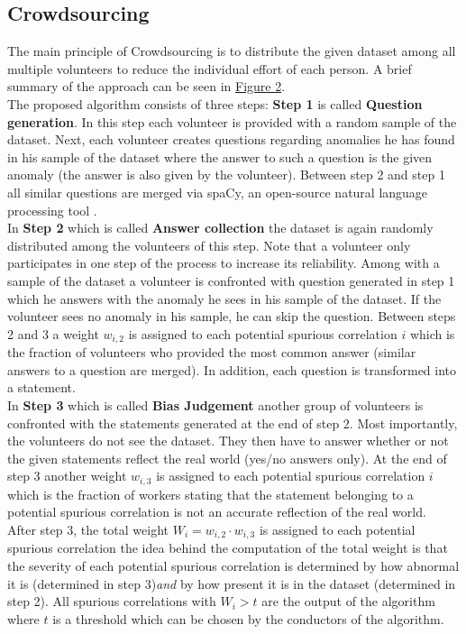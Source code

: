 \documentclass{article}
\begin{document}
\subsection{Crowdsourcing}
The main principle of Crowdsourcing \cite{10.1145/3366423.3380063} is to distribute the given dataset
among all multiple volunteers to reduce the individual effort of each person. A brief summary of the approach
can be seen in \hyperref[fig:crowdsourcing]{Figure 2}. \\
The proposed algorithm consists of three steps: \textbf{Step 1} is called \textbf{Question generation}.
In this step each volunteer is provided with a random sample of the dataset. Next, each volunteer creates questions regarding
anomalies he has found in his sample of the dataset where the answer to such a question is the given anomaly
(the answer is also given by the volunteer). Between step 2 and step 1 all similar questions are merged via spaCy,
an open-source natural language processing tool \cite{spaCy}. \\
In \textbf{Step 2} which is called \textbf{Answer collection} the dataset is again randomly distributed among the volunteers
of this step. Note that a volunteer only participates in one step of the process to increase its reliability.
Among with a sample of the dataset a volunteer is confronted with question generated in step 1 which he answers with the
anomaly he sees in his sample of the dataset. If the volunteer sees no anomaly in his sample, he can skip the question.
Between steps 2 and 3 a weight $w_{i,2}$ is assigned to each potential spurious correlation $i$ which is the fraction of
volunteers who provided the most common answer (similar answers to a question are merged).
In addition, each question is transformed into a statement. \\
In \textbf{Step 3} which is called \textbf{Bias Judgement} another group of volunteers is confronted with the statements
generated at the end of step 2. Most importantly, the volunteers do not see the dataset.
They then have to answer whether or not the given statements reflect the real world (yes/no answers only).
At the end of step 3 another weight $w_{i,3}$ is assigned to each potential spurious correlation $i$ which is the fraction
of workers stating that the statement belonging to a potential spurious correlation is not an accurate
reflection of the real world. \\
After step 3, the total weight $W_{i}=w_{i,2} \cdot w_{i,3}$ is assigned to each potential spurious correlation the idea
behind the computation of the total weight is that the severity of each potential spurious correlation is determined by
how abnormal it is (determined in step 3)\textit{and} by how present it is in the dataset (determined in step 2).
All spurious correlations with $W_i > t$ are the output of the algorithm where $t$ is a threshold which can be chosen
by the conductors of the algorithm. \\
\end{document}
